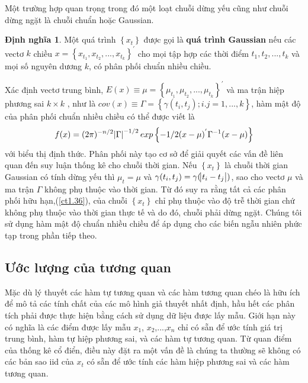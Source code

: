 \documentclass[12pt, a4paper,oneside]{book}
\theoremstyle{definition}
\newtheorem{dn}[theo]{Định nghĩa}
\begin{document}
Một trường hợp quan trọng trong đó một loạt chuỗi dừng yếu cũng như chuỗi dừng ngặt là chuỗi chuẩn hoặc Gaussian.
\begin{dn} Một quá trình $ \left\lbrace x_{t}\right\rbrace  $ được gọi là \textbf{quá trình Gaussian} nếu các vectơ $ k $ chiều $ x=\left\lbrace x_{t_{1}}, x_{t_{2}}, ..., x_{t_{k}}\right\rbrace^{'} $ cho mọi tập hợp các thời điểm $t_{1},t_{2},...,t_{k}$ và mọi số nguyên dương $ k $, có phân phối chuẩn nhiều chiều.
\end{dn}

Xác định vectơ trung bình, $E(x)\equiv\mu=\left\lbrace \mu_{t_{1}}, \mu_{t_{2}}, ..., \mu_{t_{k}}\right\rbrace^{'}$ và ma trận hiệp phương sai $ k \times k $ , như là $ cov(x)\equiv\Gamma=\left\lbrace \gamma(t_{i},t_{j});i.j=1,...,k\right\rbrace $, hàm mật độ của phân phối chuẩn nhiều chiều có thể được viết là
\begin{equation}
f(x)=(2\pi)^{-n/2}\abs{\Gamma}^{-1/2}exp \left\lbrace-1/2(x-\mu)^{'}\Gamma^{-1}(x-\mu)\right\rbrace  \label{ct1.36}	
\end{equation} với \abs{\cdot} biểu thị định thức. Phân phối này tạo cơ sở để giải quyết các vấn đề liên quan đến suy luận thống kê cho chuỗi thời gian. Nếu  $ \left\lbrace x_{t}\right\rbrace  $ là chuỗi thời gian Gaussian có tính dừng yếu thì $ \mu_{t}=\mu $ và $\gamma(t_{i},t_{j})=\gamma(\abs{t_{i}-t_{j}}) $, sao cho vectơ $ \mu $ và ma trận $ \Gamma $ không phụ thuộc vào thời gian. Từ đó suy ra rằng tất cả các phân phối hữu hạn,(\ref{ct1.36}), của chuỗi $ \left\lbrace x_{t}\right\rbrace  $ chỉ phụ thuộc vào độ trễ thời gian chứ không phụ thuộc vào thời gian thực tế và do đó, chuỗi phải dừng ngặt. Chúng tôi sử dụng hàm mật độ chuẩn nhiều chiều để áp dụng cho các biến ngẫu nhiên phức tạp trong phần tiếp theo.
\subsection{Ước lượng của tương quan}
Mặc dù lý thuyết các hàm tự tương quan và các hàm tương quan chéo là hữu ích để mô tả các tính chất của các mô hình giả thuyết nhất định, hầu hết các phân tích phải được thực hiện bằng cách sử dụng dữ liệu được lấy mẫu. Giới hạn này có nghĩa là các điểm được lấy mẫu $x_ 1$, $x_2$,...,$x_n$ chỉ có sẵn để ước tính giá trị trung bình, hàm tự hiệp phương sai, và các hàm tự tương quan. Từ quan điểm của thống kê cổ điển, điều này đặt ra một vấn đề là chúng ta thường sẽ không có các bản sao iid của $x_t$ có sẵn để ước tính các hàm hiệp phương sai và các hàm tương quan.
\end{document}
